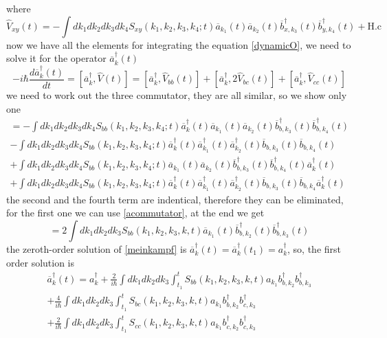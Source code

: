 where 
\begin{equation}\hat{V}_{xy}(t) = -\int dk_1dk_2dk_3dk_4S_{xy}(k_1,k_2,k_3,k_4;t)\overline{a}_{k_1}(t)\overline{a}_{k_2}(t)\overline{b}_{x,k_3}^\dagger(t) \overline{b}_{y,k_4}^\dagger(t) +\text{H.c}\end{equation}
now we have all the elements for integrating the equation \eqref{dynamicO}, we need to solve it for the operator $\overline{a}^\dagger_{k}(t)$
\begin{equation}\label{meinkampf}-i\hbar \frac{d\overline{a}^\dagger_{k}(t)}{dt} = [\overline{a}^\dagger_{k},\hat{V}(t)] = [\overline{a}^\dagger_{k},\hat{V}_{bb}(t)] + [\overline{a}^\dagger_{k},2\hat{V}_{bc}(t)] +[\overline{a}^\dagger_{k},\hat{V}_{cc}(t)]\end{equation}
we need to work out the three commutator, they are all  similar, so we show only one
\begin{multline}[\overline{a}^\dagger_{k},\hat{V}_{bb}(t)] = -\int dk_1dk_2dk_3dk_4S_{bb}(k_1,k_2,k_3,k_4;t)\overline{a}^\dagger_{k}(t)\overline{a}_{k_1}(t)\overline{a}_{k_2}(t)\overline{b}_{b,k_3}^\dagger(t) \overline{b}_{b,k_4}^\dagger(t) \\
-\int dk_1dk_2dk_3dk_4S_{bb}(k_1,k_2,k_3,k_4;t)\overline{a}^\dagger_{k}(t)\overline{a}^\dagger_{k_1}(t)\overline{a}^\dagger_{k_2}(t)\overline{b}_{b,k_3}(t) \overline{b}_{b,k_4}(t) \\
+ \int dk_1dk_2dk_3dk_4S_{bb}(k_1,k_2,k_3,k_4;t)\overline{a}_{k_1}(t)\overline{a}_{k_2}(t)\overline{b}_{b,k_3}^\dagger(t) \overline{b}_{b,k_4}^\dagger(t)\overline{a}^\dagger_{k}(t)\\ 
+ \int dk_1dk_2dk_3dk_4S_{bb}(k_1,k_2,k_3,k{}_4;t)\overline{a}^\dagger_{k}(t)\overline{a}^\dagger_{k_1}(t)\overline{a}^\dagger_{k_2}(t)\overline{b}_{b,k_3}(t) \overline{b}_{b,k_4}\overline{a}^\dagger_{k}(t) \end{multline}
the second and the fourth term are indentical, therefore they can be eliminated, for the first one we can use \eqref{acommutator}, at the end we get
\begin{equation}[\overline{a}^\dagger_{k},\hat{V}_{bb}(t)] = 2\int dk_1 dk_2 dk_3 S_{bb}(k_1,k_2,k_3,k,t)\overline{a}_{k_1}(t)\overline{b}_{b,k_2}^\dagger(t)\overline{b}_{b,k_3}^\dagger(t)\end{equation}
the zeroth-order solution of \eqref{meinkampf} is $\overline{a}^\dagger_{k}(t) = \overline{a}^\dagger_{k}(t_1) = a_k^\dagger$, so, the first order solution is
\begin{multline}\label{abarra}\overline{a}^\dagger_{k}(t) = a_k^\dagger + \frac{2}{i\hbar}\int dk_1dk_2 dk_3 \int_{t_1}^tS_{bb}(k_1,k_2,k_3,k,t)a_{k_1}b_{b,k_2}^\dagger b_{b,k_3}^\dagger \\+\frac{4}{i\hbar}\int dk_1dk_2 dk_3 \int_{t_1}^tS_{bc}(k_1,k_2,k_3,k,t)a_{k_1}b_{b,k_2}^\dagger b_{c,k_3}^\dagger \\
+ \frac{2}{i\hbar}\int dk_1dk_2 dk_3 \int_{t_1}^tS_{cc}(k_1,k_2,k_3,k,t)a_{k_1}b_{c,k_2}^\dagger b_{c,k_3}^\dagger \end{multline}
